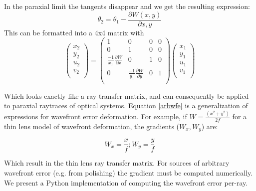 \documentclass{article}
\begin{document}
	In the paraxial limit the tangents disappear and we get the resulting expression:
	\begin{equation}
		\theta_{2} = \theta_{1} - \frac{\partial W(x,y)}{\partial x,y}
	\end{equation}
	This can be formatted into a 4x4 matrix with
	\begin{equation}
		\begin{pmatrix}
			x_2 \\
			y_2 \\
			u_2 \\
			v_2 \\
		\end{pmatrix}
		=
		\begin{pmatrix}
			1 & 0 & 0 & 0 \\
			0 & 1 & 0 & 0 \\
			\frac{-1}{x_1}\frac{\partial W}{\partial x} & 0 & 1 & 0 \\
			0 & \frac{-1}{y_1}\frac{\partial W}{\partial y} & 0 & 1 \\
		\end{pmatrix}
		\begin{pmatrix}
			x_1 \\
			y_1 \\
			u_1 \\
			v_1 \\
		\end{pmatrix}
		\label{arbwfe}
	\end{equation}
	
	Which looks exactly like a ray transfer matrix, and can consequently be applied to paraxial raytraces of optical systems. Equation \ref{arbwfe} is a generalization of expressions for wavefront error deformation. For example, if $W = \frac{(x^{2} + y^{2})}{2f}$ for a thin lens model of wavefront deformation, the gradients ($W_{x}, W_{y}$) are:
	
	\begin{equation}
		W_{x} = \frac{x}{f}; W_{y} = \frac{y}{f}
	\end{equation}
	
	Which result in the thin lens ray transfer matrix. For sources of arbitrary wavefront error (e.g. from polishing) the gradient must be computed numerically. We present a Python implementation of computing the wavefront error per-ray.
	
	
	
	
\end{document}
